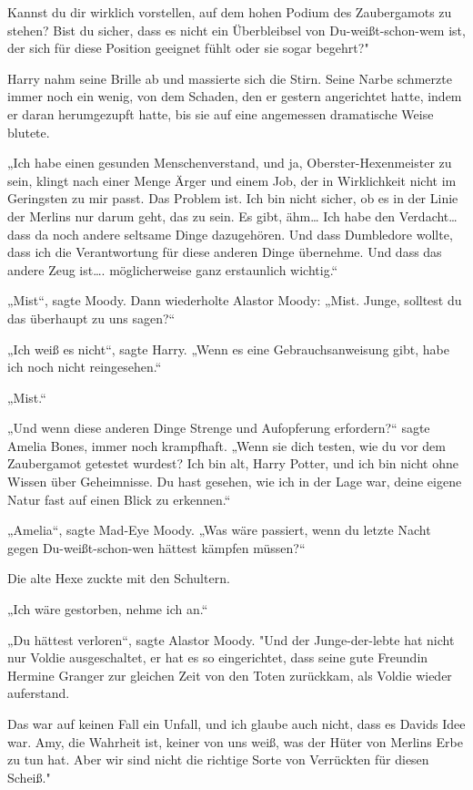 {Kannst du dir wirklich vorstellen, auf dem hohen Podium des Zaubergamots zu stehen? Bist du sicher, dass es nicht ein Überbleibsel von Du-weißt-schon-wem ist, der sich für diese Position geeignet fühlt oder sie sogar begehrt?"

Harry nahm seine Brille ab und massierte sich die Stirn. Seine Narbe schmerzte immer noch ein wenig, von dem Schaden, den er gestern angerichtet hatte, indem er daran herumgezupft hatte, bis sie auf eine angemessen dramatische Weise blutete.

„Ich habe einen gesunden Menschenverstand, und ja, Oberster-Hexenmeister zu sein, klingt nach einer Menge Ärger und einem Job, der in Wirklichkeit nicht im Geringsten zu mir passt. Das Problem ist. Ich bin nicht sicher, ob es in der Linie der Merlins nur darum geht, das zu sein. Es gibt, ähm… Ich habe den Verdacht… dass da noch andere seltsame Dinge dazugehören. Und dass Dumbledore wollte, dass ich die Verantwortung für diese anderen Dinge übernehme. Und dass das andere Zeug ist…. möglicherweise ganz erstaunlich wichtig.“

„Mist“, sagte Moody. Dann wiederholte Alastor Moody: „Mist. Junge, solltest du das überhaupt zu uns sagen?“

„Ich weiß es nicht“, sagte Harry. „Wenn es eine Gebrauchsanweisung gibt, habe ich noch nicht reingesehen.“

„Mist.“

„Und wenn diese anderen Dinge Strenge und Aufopferung erfordern?“ sagte Amelia Bones, immer noch krampfhaft. „Wenn sie dich testen, wie du vor dem Zaubergamot getestet wurdest? Ich bin alt, Harry Potter, und ich bin nicht ohne Wissen über Geheimnisse. Du hast gesehen, wie ich in der Lage war, deine eigene Natur fast auf einen Blick zu erkennen.“

„Amelia“, sagte Mad-Eye Moody. „Was wäre passiert, wenn du letzte Nacht gegen Du-weißt-schon-wen hättest kämpfen müssen?“

Die alte Hexe zuckte mit den Schultern.

„Ich wäre gestorben, nehme ich an.“

„Du hättest verloren“, sagte Alastor Moody. "Und der Junge-der-lebte hat nicht nur Voldie ausgeschaltet, er hat es so eingerichtet, dass seine gute Freundin Hermine Granger zur gleichen Zeit von den Toten zurückkam, als Voldie wieder auferstand.

Das war auf keinen Fall ein Unfall, und ich glaube auch nicht, dass es Davids Idee war. Amy, die Wahrheit ist, keiner von uns weiß, was der Hüter von Merlins Erbe zu tun hat. Aber wir sind nicht die richtige Sorte von Verrückten für diesen Scheiß."

}
